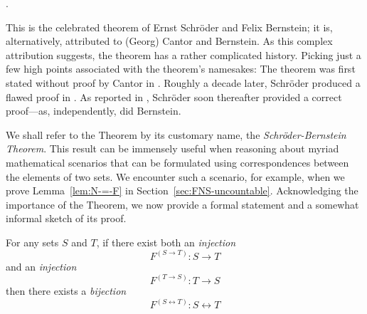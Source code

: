 \hspace*{.2in}{\em a bijection between $S$ and $T$}.


\noindent
This is the celebrated theorem of Ernst Schr\"{o}der and Felix Bernstein; it is, alternatively, attributed to (Georg) Cantor and Bernstein.  As this complex attribution suggests, the theorem has a rather complicated history.  Picking just a few high points associated with the theorem's namesakes: The theorem was first stated without proof by Cantor in \cite{Cantor87}.  Roughly a decade later, Schr\"{o}der produced a flawed proof in \cite{Schroeder98a}.  As reported in \cite{Deiser2010}, Schr\"{o}der soon thereafter provided a correct proof---as, independently, did Bernstein.

We shall refer to the Theorem by its customary name, the {\it Schr\"{o}der-Bernstein Theorem}. This result can be immensely useful when reasoning about myriad mathematical scenarios that can be formulated using correspondences between the elements of two sets.  We encounter such a scenario, for example, when we prove Lemma~\ref{lem:N-=-F} in Section~\ref{sec:FNS-uncountable}.  Acknowledging the importance of the Theorem, we now provide a formal statement and a somewhat informal sketch of its proof.

\begin{theorem}
\label{thm.S-B}
For any sets $S$ and $T$, if there exist both an {\em injection}
\[ F^{(S \rightarrow T)}: S \rightarrow T \]
and an {\em injection}
\[ F^{(T \rightarrow S)}: T \rightarrow S \]
then there exists a {\em bijection}
\[ F^{(S \leftrightarrow T)}: S \leftrightarrow T \]
\end{theorem}

